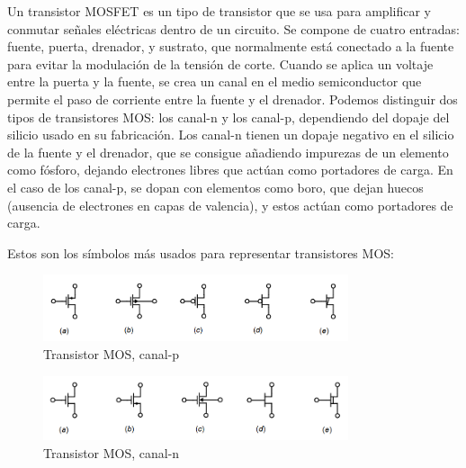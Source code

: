 \documentclass[12pt]{report} %
\begin{document}
	
	Un transistor MOSFET es un tipo de transistor que se usa para amplificar y conmutar señales eléctricas dentro de un circuito. Se compone de cuatro entradas: fuente, puerta, drenador, y sustrato, que normalmente está conectado a la fuente para evitar la modulación de la tensión de corte. Cuando se aplica un voltaje entre la puerta y la fuente, se crea un canal en el medio semiconductor que permite el paso de corriente entre la fuente y el drenador. Podemos distinguir dos tipos de transistores MOS: los canal-n y los canal-p, dependiendo del dopaje del silicio usado en su fabricación. Los canal-n tienen un dopaje negativo en el silicio de la fuente y el drenador, que se consigue añadiendo impurezas de un elemento como fósforo, dejando electrones libres que actúan como portadores de carga. En el caso de los canal-p, se dopan con elementos como boro, que dejan huecos (ausencia de electrones en capas de valencia), y estos actúan como portadores de carga.
	
	Estos son los símbolos más usados para representar transistores MOS:
	
	\begin{figure}[H]
		\includegraphics[width=0.8\textwidth]{p-mos-symbol.png}
		\caption[Transistor MOS, canal-p]{Transistor MOS, canal-p\protect\footnotemark}
		\label{fig:p-mos-symbol.png}
	\end{figure}

	
	\begin{figure}[H]
		\includegraphics[width=0.8\textwidth]{n-mos-symbol.png}
		\caption[Transistor MOS, canal-n]{Transistor MOS, canal-n\protect\footnotemark}
		\label{fig:n-mos-symbol.png}
	\end{figure}

\end{document}
